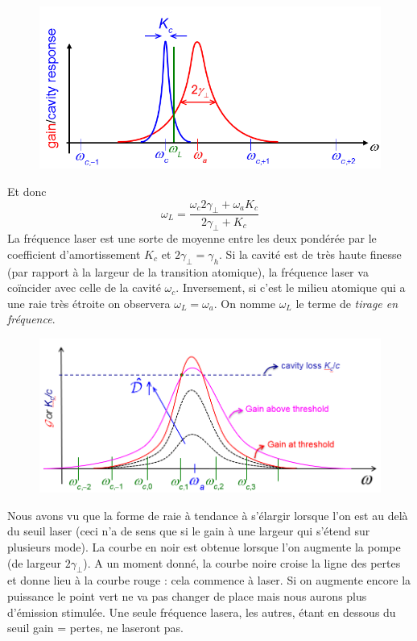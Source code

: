 	\begin{figure}
	\vspace{-5mm}
	\includegraphics[scale=0.5]{ch3/image12.png}
	\end{figure}
Et donc
\begin{equation}
{\omega _L} = \frac{{{\omega _c}2{\gamma _ \bot } + {\omega _a}{K_c}}}{{2{\gamma _ \bot } + {K_c}}}
\end{equation}
La fréquence laser est une sorte de moyenne entre les deux pondérée par le coefficient d'amortissement 
$K_c$ et $2\gamma_\perp=\gamma_h$. Si la cavité est de très haute finesse (par rapport à la largeur 
de la transition atomique), la fréquence laser va coïncider avec celle de la cavité $\omega_c$. 
Inversement, si c'est le milieu atomique qui a une raie très étroite on observera $\omega_L=\omega_a$. 
On nomme $\omega_L$ le terme de \textit{tirage en fréquence}.\\

	\begin{figure}
	\vspace{-5mm}
	\includegraphics[scale=0.45]{ch3/image13.png}
	\end{figure}
Nous avons vu que la forme de raie à tendance à s'élargir lorsque l'on est au delà du seuil laser 
(ceci n'a de sens que si le gain à une largeur qui s'étend sur plusieurs mode). La courbe en noir 
est obtenue lorsque l'on augmente la pompe (de largeur $2\gamma_\perp$). A un moment donné, la 
courbe noire croise la ligne des pertes et donne lieu à la courbe rouge : cela commence à laser. Si 
on augmente encore la puissance le point vert ne va pas changer de place mais nous aurons plus 
d'émission stimulée. Une seule fréquence lasera, les autres, étant en dessous du seuil gain = pertes,
ne laseront pas. \\


